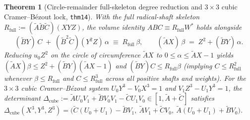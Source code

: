 \documentclass[11pt,a4paper]{article}
\theoremstyle{plain}
\newtheorem{theorem}{Theorem}[section]
\theoremstyle{definition}
\begin{document}
\begin{theorem}[Circle-remainder full-skeleton degree reduction and $3\times 3$ cubic Cramer--B\'ezout lock, \texttt{thm14}]
\label{thm:circle-remainder-thm14}
With the full radical-shaft skeleton $R_{\mathrm{full}} := (\widetilde{A}\widetilde{B}\widetilde{C})(X Y Z)$, the volume identity $A B C \equiv R_{\mathrm{full}} W^*$ holds alongside
\begin{equation}
  \label{eq:circle-remainder-rfull}
  (\widetilde{B}Y)\,C \;+\; (\widetilde{B}^2\widetilde{C})(Y^2 Z)\,\alpha \;\equiv\; R_{\mathrm{full}}\,\beta,\qquad
  (\widetilde{A}X)\,\beta \;=\; Z^2 + (\widetilde{B}Y)\,\alpha.
\end{equation}
Reducing $u_0 Z^2$ on the circle of circumference $\widetilde{A}X$ to $0\le\alpha\le\widetilde{A}X-1$ yields $(\widetilde{A}X)\beta \le Z^2 + (\widetilde{B}Y)(\widetilde{A}X-1)$ and $(\widetilde{B}Y)C \le R_{\mathrm{full}}\beta$ (implying $C \le R_{\mathrm{full}}^2$ whenever $\beta\le R_{\mathrm{full}}$ and $C \le R_{\mathrm{full}}^3$ across all positive shafts and weights). For the $3\times 3$ cubic Cramer--B\'ezout system $U_0 Y^3 - V_0 X^3 = 1$ and $V_1 Z^3 - U_1 Y^3 = 1$, the determinant $\Delta_{\mathrm{cube}} := \widetilde{A}U_0 V_1 + \widetilde{B}V_0 V_1 - \widetilde{C}U_1 V_0 \in [1, \widetilde{A}+\widetilde{C}]$ satisfies $\Delta_{\mathrm{cube}}(X^3, Y^3, Z^3) = \bigl(\widetilde{C}(U_0+U_1)-\widetilde{B}V_1,\ \widetilde{A}V_1+\widetilde{C}V_0,\ \widetilde{A}(U_0+U_1)+\widetilde{B}V_0\bigr)$.
\end{theorem}
\end{document}
